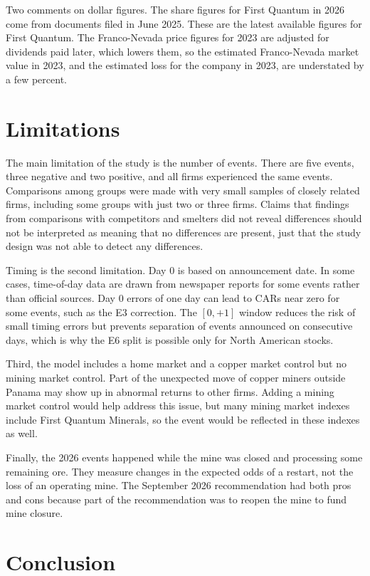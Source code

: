 \documentclass[11pt]{article}
\begin{document}
Two comments on dollar figures. The share figures for First Quantum in 2026 come from documents filed in June 2025. These are the latest available figures for First Quantum. The Franco-Nevada price figures for 2023 are adjusted for dividends paid later, which lowers them, so the estimated Franco-Nevada market value in 2023, and the estimated loss for the company in 2023, are understated by a few percent.

\section{Limitations}

The main limitation of the study is the number of events. There are five events, three negative and two positive, and all firms experienced the same events. Comparisons among groups were made with very small samples of closely related firms, including some groups with just two or three firms. Claims that findings from comparisons with competitors and smelters did not reveal differences should not be interpreted as meaning that no differences are present, just that the study design was not able to detect any differences.

Timing is the second limitation. Day 0 is based on announcement date. In some cases, time-of-day data are drawn from newspaper reports for some events rather than official sources. Day 0 errors of one day can lead to CARs near zero for some events, such as the E3 correction. The $[0, +1]$ window reduces the risk of small timing errors but prevents separation of events announced on consecutive days, which is why the E6 split is possible only for North American stocks.

Third, the model includes a home market and a copper market control but no mining market control. Part of the unexpected move of copper miners outside Panama may show up in abnormal returns to other firms. Adding a mining market control would help address this issue, but many mining market indexes include First Quantum Minerals, so the event would be reflected in these indexes as well.

Finally, the 2026 events happened while the mine was closed and processing some remaining ore. They measure changes in the expected odds of a restart, not the loss of an operating mine. The September 2026 recommendation had both pros and cons because part of the recommendation was to reopen the mine to fund mine closure.

\section{Conclusion}
\end{document}

